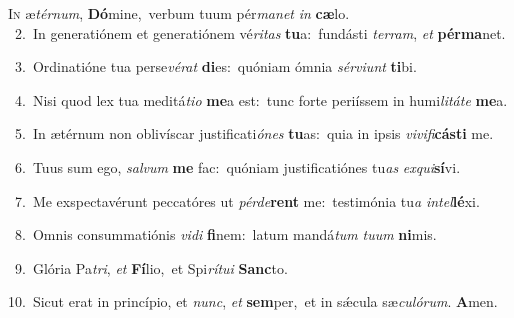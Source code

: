 \lettrine{\initial\textcolor{\initialcolor}{I}}{n} æ\-\textit{tér}\-\textit{num}, \textbf{Dó}\-mine,~\star verbum tuum pér\-\textit{ma}\-\textit{net} \textit{in} \textbf{cæ}\-lo.\\
{\numbfont\textcolor{\numbcolor}{~2.}}~In generatiónem et generatiónem vé\-\textit{ri}\-\textit{tas} \textbf{tu}\-a:~\star fundásti \textit{ter}\-\textit{ram}, \textit{et} \textbf{pér}\-\textbf{ma}net.\par
{\numbfont\textcolor{\numbcolor}{~3.}}~Ordinatióne tua perse\-\textit{vé}\-\textit{rat} \textbf{di}\-es:~\star quóniam ómnia \textit{sér}\-\textit{vi}\textit{unt} \textbf{ti}\-bi.\par
{\numbfont\textcolor{\numbcolor}{~4.}}~Nisi quod lex tua meditá\-\textit{ti}\-\textit{o} \textbf{me}\-a est:~\star tunc forte periíssem in humi\-\textit{li}\-\textit{tá}\textit{te} \textbf{me}\-a.\par
{\numbfont\textcolor{\numbcolor}{~5.}}~In ætérnum non oblivíscar justificati\-\textit{ó}\-\textit{nes} \textbf{tu}\-as:~\star quia in ipsis \textit{vi}\-\textit{vi}\textit{fi}\textbf{cás}\textbf{ti} me.\par
{\numbfont\textcolor{\numbcolor}{~6.}}~Tuus sum ego, \textit{sal}\-\textit{vum} \textbf{me} fac:~\star quóniam justificatiónes tu\textit{as} \textit{ex}\-\textit{qui}\textbf{sí}vi.\par
{\numbfont\textcolor{\numbcolor}{~7.}}~Me exspectavérunt peccatóres ut \textit{pér}\-\textit{de}\textbf{rent} me:~\star testimónia tu\textit{a} \textit{in}\-\textit{tel}\textbf{lé}xi.\par
{\numbfont\textcolor{\numbcolor}{~8.}}~Omnis consummatiónis \textit{vi}\-\textit{di} \textbf{fi}\-nem:~\star latum mandá\textit{tum} \textit{tu}\-\textit{um} \textbf{ni}\-mis.\par
{\numbfont\textcolor{\numbcolor}{~9.}}~Glória Pa\-\textit{tri}\-, \textit{et} \textbf{Fí}\-lio,~\star et Spi\-\textit{rí}\-\textit{tu}\textit{i} \textbf{Sanc}\-to.\par
{\numbfont\textcolor{\numbcolor}{10.}}~Sicut erat in princípio, et \textit{nunc}\-, \textit{et} \textbf{sem}\-per,~\star et in sǽcula sæ\-\textit{cu}\-\textit{ló}\textit{rum}. \textbf{A}\-men.\par
